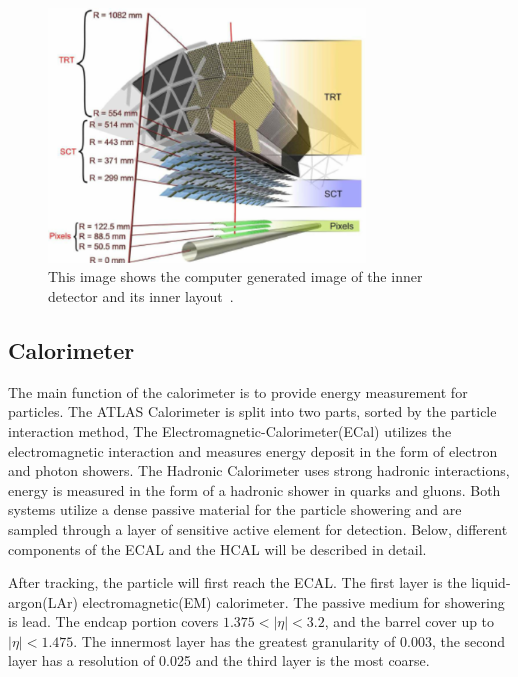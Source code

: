 \begin{figure}[!htb]
    \begin{center}
        \includegraphics[width=0.75\textwidth]{figures/chapter_ATLAS/InnerDetector2}
        \caption{
            This image shows the computer generated image of the inner detector and its inner layout~\cite{Pequenao:1095926}.
        }
        \label{fig:InnerDetector2}
    \end{center}
\end{figure}

\subsection{Calorimeter}
The main function of the calorimeter is to provide energy measurement for particles. The ATLAS Calorimeter is split into two parts, sorted by the particle interaction method, The Electromagnetic-Calorimeter(ECal) utilizes the electromagnetic interaction and measures energy deposit in the form of electron and photon showers. The Hadronic Calorimeter uses strong hadronic interactions, energy is measured in the form of a hadronic shower in quarks and gluons. Both systems utilize a dense passive material for the particle showering and are sampled through a layer of sensitive active element for detection. Below, different components of the ECAL and the HCAL will be described in detail. 

After tracking, the particle will first reach the ECAL. The first layer is the liquid-argon(LAr) electromagnetic(EM) calorimeter. The passive medium for showering is lead. The endcap portion covers $1.375< |\eta| < 3.2$, and the barrel cover up to $|\eta|<1.475$. The innermost layer has the greatest granularity of 0.003, the second layer has a resolution of 0.025 and the third layer is the most coarse. 

